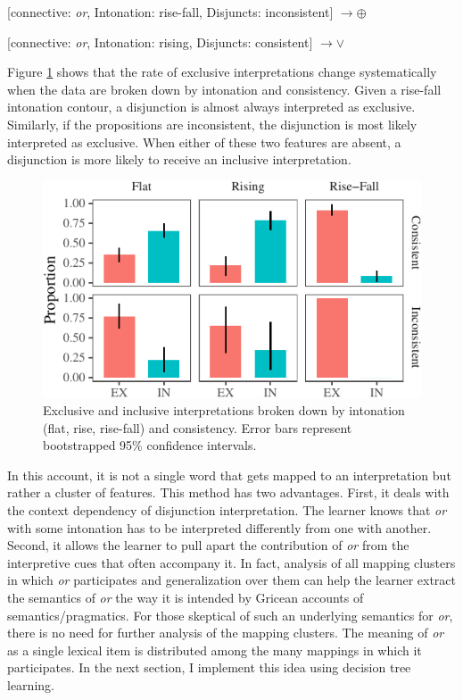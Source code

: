 \documentclass[floatsintext,man]{apa6}
\theoremstyle{definition}
\theoremstyle{definition}
\theoremstyle{definition}
\theoremstyle{remark}
\begin{document}
{[}connective: \emph{or}, Intonation: rise-fall, Disjuncts:
inconsistent{]} \(\rightarrow \oplus\)

{[}connective: \emph{or}, Intonation: rising, Disjuncts: consistent{]}
\(\rightarrow \lor\)

Figure \ref{fig:interpretationByIntonationAndConsistency} shows that the
rate of exclusive interpretations change systematically when the data
are broken down by intonation and consistency. Given a rise-fall
intonation contour, a disjunction is almost always interpreted as
exclusive. Similarly, if the propositions are inconsistent, the
disjunction is most likely interpreted as exclusive. When either of
these two features are absent, a disjunction is more likely to receive
an inclusive interpretation.

\begin{figure}[tb]

{\centering \includegraphics{figs/interpretationByIntonationAndConsistency-1} 

}

\caption{Exclusive and inclusive interpretations broken down by intonation (flat, rise, rise-fall) and consistency. Error bars represent bootstrapped 95\% confidence intervals.}\label{fig:interpretationByIntonationAndConsistency}
\end{figure}

In this account, it is not a single word that gets mapped to an
interpretation but rather a cluster of features. This method has two
advantages. First, it deals with the context dependency of disjunction
interpretation. The learner knows that \emph{or} with some intonation
has to be interpreted differently from one with another. Second, it
allows the learner to pull apart the contribution of \emph{or} from the
interpretive cues that often accompany it. In fact, analysis of all
mapping clusters in which \emph{or} participates and generalization over
them can help the learner extract the semantics of \emph{or} the way it
is intended by Gricean accounts of semantics/pragmatics. For those
skeptical of such an underlying semantics for \emph{or}, there is no
need for further analysis of the mapping clusters. The meaning of
\emph{or} as a single lexical item is distributed among the many
mappings in which it participates. In the next section, I implement this
idea using decision tree learning.
\end{document}
